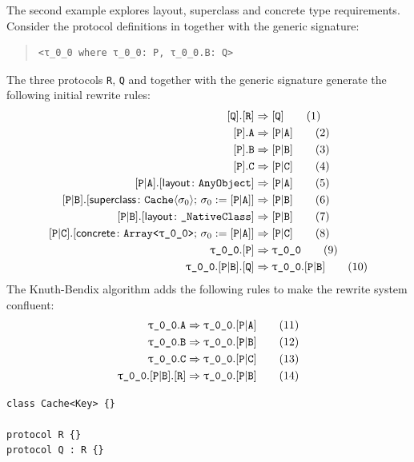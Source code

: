 \documentclass[../generics]{subfiles}
\begin{document}
\begin{example}\label{propmapexample3}
The second example explores layout, superclass and concrete type requirements. Consider the protocol definitions in  together with the generic signature:
\begin{quote}
\begin{verbatim}
<τ_0_0 where τ_0_0: P, τ_0_0.B: Q>
\end{verbatim}
\end{quote}
The three protocols \texttt{R}, \texttt{Q} and \tP together with the generic signature generate the following initial rewrite rules:
\begin{align*}
\pQ.\pR&\Rightarrow\pQ\tag{1}\\
\pP.\nA&\Rightarrow\assocsym{P}{A}\tag{2}\\
\pP.\nB&\Rightarrow\assocsym{P}{B}\tag{3}\\
\pP.\nC&\Rightarrow\assocsym{P}{C}\tag{4}\\
\assocsym{P}{A}.\layoutsym{AnyObject}&\Rightarrow\assocsym{P}{A}\tag{5}\\
\assocsym{P}{B}.\supersym{\texttt{Cache}\langle\sigma_0\rangle;\,\sigma_0:=\assocsym{P}{A}}&\Rightarrow\assocsym{P}{B}\tag{6}\\
\assocsym{P}{B}.\layoutsym{\_NativeClass}&\Rightarrow\assocsym{P}{B}\tag{7}\\
\assocsym{P}{C}.\concretesym{\texttt{Array<\rT>};\,\sigma_0:=\assocsym{P}{A}}&\Rightarrow\assocsym{P}{C}\tag{8}\\
\rT.\pP&\Rightarrow\rT\tag{9}\\
\rT.\assocsym{P}{B}.\pQ&\Rightarrow\rT.\assocsym{P}{B}\tag{10}
\end{align*}
The Knuth-Bendix algorithm adds the following rules to make the rewrite system confluent:
\begin{align*}
\rT.\nA&\Rightarrow\rT.\assocsym{P}{A}\tag{11}\\
\rT.\nB&\Rightarrow\rT.\assocsym{P}{B}\tag{12}\\
\rT.\texttt{C}&\Rightarrow\rT.\assocsym{P}{C}\tag{13}\\
\rT.\assocsym{P}{B}.\pR&\Rightarrow\rT.\assocsym{P}{B}\tag{14}
\end{align*}
\begin{listing}\label{propmaplisting}
\begin{Verbatim}
class Cache<Key> {}

protocol R {}
protocol Q : R {}


\end{Verbatim}
\end{listing}
\end{example}
\end{document}

